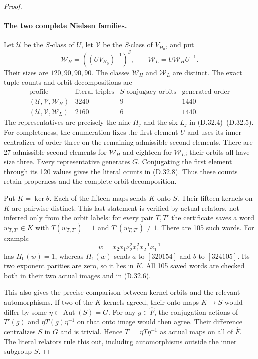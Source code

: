 \begin{proof}
\paragraph{The two complete Nielsen families.}
Let $\mathcal U$ be the $S$-class
of $U$, let $\mathcal V$ be the
$S$-class of $V_{H_0}$, and put
\[
 \mathcal W_H=((UV_{H_0})^{-1})^S,\qquad
 \mathcal W_L=U\mathcal W_HU^{-1}.
 \tag{D.32.7}
\]
Their sizes are $120,90,90,90$.
The classes $\mathcal W_H$ and
$\mathcal W_L$ are distinct.
The exact tuple counts and orbit
decompositions are
\[
\begin{array}{c|ccc}
 \text{profile}&\text{literal triples}
     &S\text{-conjugacy orbits}&\text{generated order}\\\hline
 (\mathcal U,\mathcal V,\mathcal W_H)&3240&9&1440\\
 (\mathcal U,\mathcal V,\mathcal W_L)&2160&6&1440.
\end{array}
 \tag{D.32.8}
\]
The representatives are precisely
the nine $H_j$ and the six $L_j$
in \textup{(D.32.4)--(D.32.5)}.
For completeness, the enumeration
fixes the first element $U$ and
uses its inner centralizer of order
three on the remaining admissible
second elements.  There are 27
admissible second elements for
$\mathcal W_H$ and eighteen for
$\mathcal W_L$; their orbits all
have size three.  Every representative
generates $G$.  Conjugating the
first element through its 120
values gives the literal counts
in \textup{(D.32.8)}.  Thus these
counts retain properness and the
complete orbit decomposition.

Put $K=\ker\theta$.  Each of the
fifteen maps sends $K$ onto $S$.
Their fifteen kernels on $K$ are
pairwise distinct.  This last
statement is verified by actual
relators, not inferred only from
the orbit labels: for every pair
$T,T'$ the certificate saves a
word $w_{T,T'}\in K$ with
$T(w_{T,T'})=1$ and
$T'(w_{T,T'})\ne1$.
There are 105 such words.
For example
\[
 w=x_2x_1x_2^2x_1^2x_2^{-1}x_1^{-1}
 \tag{D.32.9}
\]
has $H_0(w)=1$, whereas $H_1(w)$
sends $a$ to $[320154]$ and
$b$ to $[324105]$.
Its two exponent parities are
zero, so it lies in $K$.
All 105 saved words are checked
both in their two actual images
and in \textup{(D.32.6)}.

This also gives the precise
comparison between kernel orbits
and the relevant automorphisms.
If two of the $K$-kernels agreed,
their onto maps $K\to S$ would
differ by some
$\eta\in\operatorname{Aut}(S)=G$.
For any $g\in\widehat F$, the
conjugation actions of $T'(g)$
and $\eta T(g)\eta^{-1}$ on
that onto image would then agree.
Their difference centralizes $S$
in $G$ and is trivial.
Hence $T'=\eta T\eta^{-1}$ as
actual maps on all of $\widehat F$.
The literal relators rule this out,
including automorphisms outside
the inner subgroup $S$.


\end{proof}
